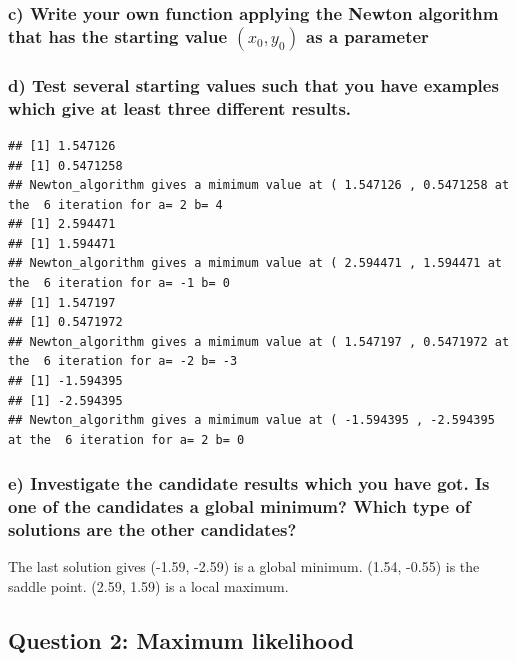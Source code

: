 \documentclass[
]{article}
\begin{document}
\subsubsection{\texorpdfstring{c) Write your own function applying the
Newton algorithm that has the starting value \((x_0, y_0)\) as a
parameter}{c) Write your own function applying the Newton algorithm that has the starting value (x\_0, y\_0) as a parameter}}\label{c-write-your-own-function-applying-the-newton-algorithm-that-has-the-starting-value-x_0-y_0-as-a-parameter}

\subsubsection{d) Test several starting values such that you have
examples which give at least three different
results.}\label{d-test-several-starting-values-such-that-you-have-examples-which-give-at-least-three-different-results.}

\begin{verbatim}
## [1] 1.547126
## [1] 0.5471258
## Newton_algorithm gives a mimimum value at ( 1.547126 , 0.5471258 at the  6 iteration for a= 2 b= 4 
## [1] 2.594471
## [1] 1.594471
## Newton_algorithm gives a mimimum value at ( 2.594471 , 1.594471 at the  6 iteration for a= -1 b= 0 
## [1] 1.547197
## [1] 0.5471972
## Newton_algorithm gives a mimimum value at ( 1.547197 , 0.5471972 at the  6 iteration for a= -2 b= -3 
## [1] -1.594395
## [1] -2.594395
## Newton_algorithm gives a mimimum value at ( -1.594395 , -2.594395 at the  6 iteration for a= 2 b= 0
\end{verbatim}

\subsubsection{e) Investigate the candidate results which you have got.
Is one of the candidates a global minimum? Which type of solutions are
the other
candidates?}\label{e-investigate-the-candidate-results-which-you-have-got.-is-one-of-the-candidates-a-global-minimum-which-type-of-solutions-are-the-other-candidates}

The last solution gives (-1.59, -2.59) is a global minimum. (1.54,
-0.55) is the saddle point. (2.59, 1.59) is a local maximum.

\subsection{Question 2: Maximum
likelihood}\label{question-2-maximum-likelihood}
\end{document}
